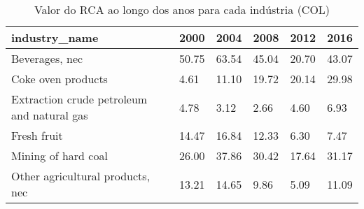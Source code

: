 \begin{table}
\centering
\caption{Valor do RCA ao longo dos anos para cada indústria (COL)}
\begin{tabular}{p{6cm}p{1.5cm}p{1.5cm}p{1.5cm}p{1.5cm}p{1.5cm}}
\toprule
                             industry\_name &  2000 &  2004 &  2008 &  2012 &  2016 \\
\midrule
                            Beverages, nec & 50.75 & 63.54 & 45.04 & 20.70 & 43.07 \\
                        Coke oven products &  4.61 & 11.10 & 19.72 & 20.14 & 29.98 \\
Extraction crude petroleum and natural gas &  4.78 &  3.12 &  2.66 &  4.60 &  6.93 \\
                               Fresh fruit & 14.47 & 16.84 & 12.33 &  6.30 &  7.47 \\
                       Mining of hard coal & 26.00 & 37.86 & 30.42 & 17.64 & 31.17 \\
          Other agricultural products, nec & 13.21 & 14.65 &  9.86 &  5.09 & 11.09 \\
\bottomrule
\end{tabular}
\end{table}
